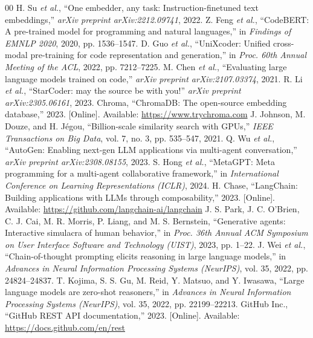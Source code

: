 \documentclass[conference]{IEEEtran}
\begin{document}
\begin{thebibliography}{00}
 H. Su \textit{et al.}, ``One embedder, any task: Instruction-finetuned text embeddings,'' \textit{arXiv preprint arXiv:2212.09741}, 2022.
 Z. Feng \textit{et al.}, ``CodeBERT: A pre-trained model for programming and natural languages,'' in \textit{Findings of EMNLP 2020}, 2020, pp. 1536--1547.
 D. Guo \textit{et al.}, ``UniXcoder: Unified cross-modal pre-training for code representation and generation,'' in \textit{Proc. 60th Annual Meeting of the ACL}, 2022, pp. 7212--7225.
 M. Chen \textit{et al.}, ``Evaluating large language models trained on code,'' \textit{arXiv preprint arXiv:2107.03374}, 2021.
 R. Li \textit{et al.}, ``StarCoder: may the source be with you!'' \textit{arXiv preprint arXiv:2305.06161}, 2023.
 Chroma, ``ChromaDB: The open-source embedding database,'' 2023. [Online]. Available: \url{https://www.trychroma.com}
 J. Johnson, M. Douze, and H. J{\'e}gou, ``Billion-scale similarity search with GPUs,'' \textit{IEEE Transactions on Big Data}, vol. 7, no. 3, pp. 535--547, 2021.
 Q. Wu \textit{et al.}, ``AutoGen: Enabling next-gen LLM applications via multi-agent conversation,'' \textit{arXiv preprint arXiv:2308.08155}, 2023.
 S. Hong \textit{et al.}, ``MetaGPT: Meta programming for a multi-agent collaborative framework,'' in \textit{International Conference on Learning Representations (ICLR)}, 2024.
 H. Chase, ``LangChain: Building applications with LLMs through composability,'' 2023. [Online]. Available: \url{https://github.com/langchain-ai/langchain}
 J. S. Park, J. C. O'Brien, C. J. Cai, M. R. Morris, P. Liang, and M. S. Bernstein, ``Generative agents: Interactive simulacra of human behavior,'' in \textit{Proc. 36th Annual ACM Symposium on User Interface Software and Technology (UIST)}, 2023, pp. 1--22.
 J. Wei \textit{et al.}, ``Chain-of-thought prompting elicits reasoning in large language models,'' in \textit{Advances in Neural Information Processing Systems (NeurIPS)}, vol. 35, 2022, pp. 24824--24837.
 T. Kojima, S. S. Gu, M. Reid, Y. Matsuo, and Y. Iwasawa, ``Large language models are zero-shot reasoners,'' in \textit{Advances in Neural Information Processing Systems (NeurIPS)}, vol. 35, 2022, pp. 22199--22213.
 GitHub Inc., ``GitHub REST API documentation,'' 2023. [Online]. Available: \url{https://docs.github.com/en/rest}

\end{thebibliography}
\end{document}
